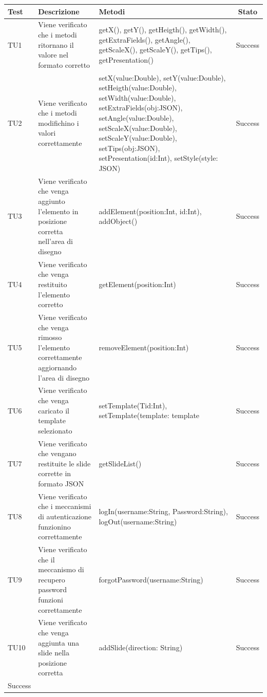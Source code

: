 \begin{table}[h]
	\begin{center}
	\begin{tabular}{|l|p{}|p{}|c|}
	\toprule
		\textbf{Test} & \textbf{Descrizione} & \textbf{Metodi} & \textbf{Stato}\\
	\midrule
		TU1 & Viene verificato che i metodi ritornano il valore nel formato corretto & getX(), getY(), getHeigth(), getWidth(), getExtraFields(), getAngle(), getScaleX(), getScaleY(), getTips(), getPresentation()  & Success\\
	\midrule
		TU2 & Viene verificato che i metodi modifichino i valori correttamente & setX(value:Double), setY(value:Double), setHeigth(value:Double), setWidth(value:Double), setExtraFields(obj:JSON), setAngle(value:Double), setScaleX(value:Double), setScaleY(value:Double), setTips(obj:JSON), setPresentation(id:Int), setStyle(style: JSON) & Success\\
	\midrule
		TU3 & Viene verificato che venga aggiunto l'elemento in posizione corretta nell'area di disegno & addElement(position:Int, id:Int), addObject() & Success\\
	\midrule
		TU4 & Viene verificato che venga restituito l'elemento corretto & getElement(position:Int) & Success\\
	\midrule
		TU5 & Viene verificato che venga rimosso l'elemento correttamente aggiornando l'area di disegno & removeElement(position:Int) & Success\\
	\midrule
		TU6 & Viene verificato che venga caricato il template selezionato & setTemplate(Tid:Int),  setTemplate(template: template & Success\\
	\midrule
		TU7 & Viene verificato che vengano restituite le slide corrette in formato JSON & getSlideList() & Success\\
	\midrule
		TU8 & Viene verificato che i meccanismi di autenticazione funzionino correttamente & logIn(username:String, Password:String), logOut(username:String) & Success\\
	\midrule
		TU9 & Viene verificato che il meccanismo di recupero password funzioni correttamente & forgotPassword(username:String) & Success\\
	\midrule
		TU10 & Viene verificato che venga aggiunta una slide nella posizione corretta & addSlide(direction: String) & Success\\ Success\\
\end{tabular}
\end{center}
\end{table}
